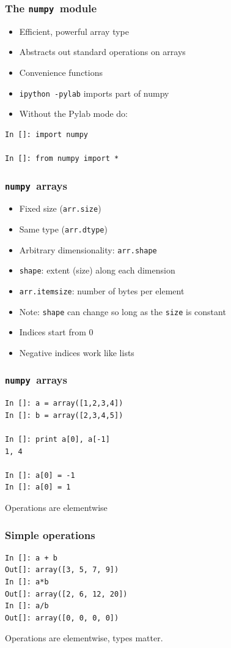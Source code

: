 \documentclass[14pt,compress]{beamer}
\newcommand{\typ}[1]{\lstinline{#1}}
\newcommand{\num}{\texttt{numpy}}
\begin{document}
\begin{frame}[fragile]
  \frametitle{The \num\ module}
    \begin{itemize}
    \item Efficient, powerful array type
    \item Abstracts out standard operations on arrays
    \item Convenience functions
    \item \typ{ipython -pylab} imports part of numpy
    \item Without the Pylab mode do:
    \end{itemize}
    \begin{lstlisting}
In []: import numpy

In []: from numpy import *
    \end{lstlisting}
\end{frame}

\begin{frame}
  \frametitle{\num\ arrays}
  \begin{itemize}
  \item Fixed size (\typ{arr.size})
  \item Same type (\typ{arr.dtype})
  \item Arbitrary dimensionality: \typ{arr.shape}
  \item \typ{shape}: extent (size) along each dimension
  \item \typ{arr.itemsize}: number of bytes per element
  \item \alert{Note:} \typ{shape} can change so long as the \typ{size}
      is constant
  \item Indices start from 0
  \item Negative indices work like lists
  \end{itemize}
\end{frame}

\begin{frame}[fragile]
  \frametitle{\num\ arrays}
\begin{lstlisting}
In []: a = array([1,2,3,4])
In []: b = array([2,3,4,5])

In []: print a[0], a[-1]
1, 4

In []: a[0] = -1
In []: a[0] = 1
\end{lstlisting}
Operations are elementwise
\end{frame}

\begin{frame}[fragile]
  \frametitle{Simple operations}
\begin{lstlisting}
In []: a + b
Out[]: array([3, 5, 7, 9])
In []: a*b
Out[]: array([2, 6, 12, 20])
In []: a/b
Out[]: array([0, 0, 0, 0])
\end{lstlisting}
Operations are elementwise, types matter.
\end{frame}
\end{document}
